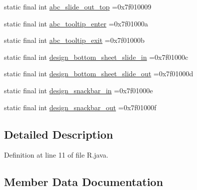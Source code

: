 \begin{DoxyCompactItemize}
\item 
static final int \mbox{\hyperlink{classcom_1_1example_1_1trainawearapplication_1_1_r_1_1anim_af8e4e1a3d044fbd0a32e936219b9380d}{abc\+\_\+slide\+\_\+out\+\_\+top}} =0x7f010009
\item 
static final int \mbox{\hyperlink{classcom_1_1example_1_1trainawearapplication_1_1_r_1_1anim_aec421bde134debbb818cf5ff2df4a442}{abc\+\_\+tooltip\+\_\+enter}} =0x7f01000a
\item 
static final int \mbox{\hyperlink{classcom_1_1example_1_1trainawearapplication_1_1_r_1_1anim_ad39ffc769632a1c60586a5b2f7322712}{abc\+\_\+tooltip\+\_\+exit}} =0x7f01000b
\item 
static final int \mbox{\hyperlink{classcom_1_1example_1_1trainawearapplication_1_1_r_1_1anim_a669156f834a6285fe184883eca2f041f}{design\+\_\+bottom\+\_\+sheet\+\_\+slide\+\_\+in}} =0x7f01000c
\item 
static final int \mbox{\hyperlink{classcom_1_1example_1_1trainawearapplication_1_1_r_1_1anim_aefca780e3dbbc5d0983fb3c7ba56c828}{design\+\_\+bottom\+\_\+sheet\+\_\+slide\+\_\+out}} =0x7f01000d
\item 
static final int \mbox{\hyperlink{classcom_1_1example_1_1trainawearapplication_1_1_r_1_1anim_a7bbe993b9793070697299db359462fb1}{design\+\_\+snackbar\+\_\+in}} =0x7f01000e
\item 
static final int \mbox{\hyperlink{classcom_1_1example_1_1trainawearapplication_1_1_r_1_1anim_a29a52a55097166be9a63844e48c44256}{design\+\_\+snackbar\+\_\+out}} =0x7f01000f
\end{DoxyCompactItemize}


\subsection{Detailed Description}


Definition at line 11 of file R.\+java.



\subsection{Member Data Documentation}
\mbox{\label{classcom_1_1example_1_1trainawearapplication_1_1_r_1_1anim_a82e75f30f76bfd5491b27925c496aac5}} 

